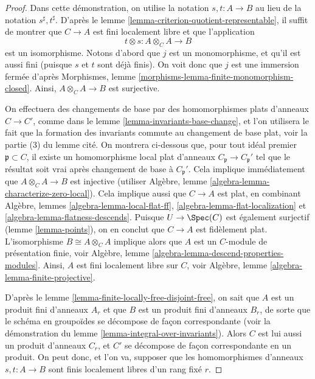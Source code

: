 \begin{proof}
Dans cette démonstration, on utilise la notation $s, t : A \to B$
au lieu de la notation $s^\sharp, t^\sharp$.
D'après le lemme \ref{lemma-criterion-quotient-representable},
il suffit de montrer que $C \to A$ est fini localement libre
et que l'application
$$
t \otimes s : A \otimes_C A \longrightarrow B
$$
est un isomorphisme. Notons d'abord que $j$ est un monomorphisme, et
qu'il est aussi fini (puisque $s$ et $t$ sont déjà finis). On voit donc
que $j$ est une immersion fermée d'après
Morphismes, lemme \ref{morphisms-lemma-finite-monomorphism-closed}.
Ainsi, $A \otimes_C A \to B$ est surjective.

\medskip\noindent
On effectuera des changements de base par des homomorphismes plats d'anneaux $C \to C'$, comme dans
le lemme \ref{lemma-invariants-base-change}, et l'on utilisera le fait que
la formation des invariants commute au changement de base plat, voir
la partie (3) du lemme cité.
On montrera ci-dessous que, pour tout idéal premier $\mathfrak p \subset C$, il existe
un homomorphisme local plat d'anneaux $C_{\mathfrak p} \to C_{\mathfrak p}'$
tel que le résultat soit vrai après changement de base à $C_{\mathfrak p}'$.
Cela implique immédiatement
que $A \otimes_C A \to B$ est injective (utiliser
Algèbre, lemme \ref{algebra-lemma-characterize-zero-local}).
Cela implique aussi que $C \to A$ est plat, en combinant
Algèbre, lemmes \ref{algebra-lemma-local-flat-ff},
\ref{algebra-lemma-flat-localization} et
\ref{algebra-lemma-flatness-descends}. Puisque $U \to \Spec(C)$
est également surjectif (lemme \ref{lemma-points}), on en conclut que $C \to A$
est fidèlement plat. L'isomorphisme $B \cong A \otimes_C A$
implique alors que $A$ est un $C$-module de présentation finie, voir
Algèbre, lemme \ref{algebra-lemma-descend-properties-modules}.
Ainsi, $A$ est fini localement libre sur $C$, voir
Algèbre, lemme \ref{algebra-lemma-finite-projective}.

\medskip\noindent
D'après le lemme \ref{lemma-finite-locally-free-disjoint-free},
on sait que $A$ est un produit fini
d'anneaux $A_r$ et que $B$ est un produit fini d'anneaux $B_r$,
de sorte que le schéma en groupoïdes se décompose de façon correspondante (voir la démonstration
du lemme \ref{lemma-integral-over-invariants}).
Alors $C$ est lui aussi un produit d'anneaux $C_r$, et
$C'$ se décompose de façon correspondante en un produit. On peut donc, et l'on va,
supposer que les homomorphismes d'anneaux $s, t : A \to B$ sont finis
localement libres d'un rang fixé $r$.


\end{proof}
